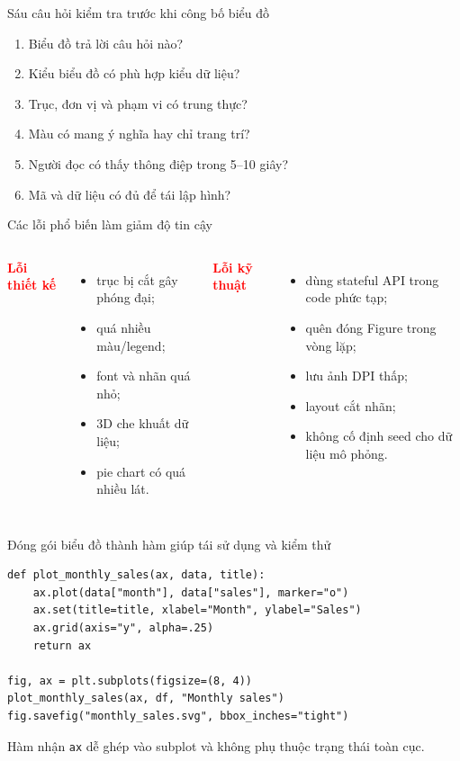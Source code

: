 \documentclass[aspectratio=169,12pt]{beamer}
\newcommand{\muted}[1]{\textcolor{Muted}{#1}}
\newcommand{\bad}[1]{\textcolor{Red}{\textbf{#1}}}
\begin{document}
\begin{frame}{Sáu câu hỏi kiểm tra trước khi công bố biểu đồ}
\begin{enumerate}\setlength\itemsep{6pt}
  \item Biểu đồ trả lời câu hỏi nào?
  \item Kiểu biểu đồ có phù hợp kiểu dữ liệu?
  \item Trục, đơn vị và phạm vi có trung thực?
  \item Màu có mang ý nghĩa hay chỉ trang trí?
  \item Người đọc có thấy thông điệp trong 5--10 giây?
  \item Mã và dữ liệu có đủ để tái lập hình?
\end{enumerate}
\end{frame}

\begin{frame}{Các lỗi phổ biến làm giảm độ tin cậy}
\begin{columns}[T,onlytextwidth]
\bad{Lỗi thiết kế}
\begin{itemize}
  \item trục bị cắt gây phóng đại;
  \item quá nhiều màu/legend;
  \item font và nhãn quá nhỏ;
  \item 3D che khuất dữ liệu;
  \item pie chart có quá nhiều lát.
\end{itemize}
\bad{Lỗi kỹ thuật}
\begin{itemize}
  \item dùng stateful API trong code phức tạp;
  \item quên đóng Figure trong vòng lặp;
  \item lưu ảnh DPI thấp;
  \item layout cắt nhãn;
  \item không cố định seed cho dữ liệu mô phỏng.
\end{itemize}
\end{columns}
\end{frame}

\begin{frame}[fragile]{Đóng gói biểu đồ thành hàm giúp tái sử dụng và kiểm thử}
\begin{lstlisting}[style=py]
def plot_monthly_sales(ax, data, title):
    ax.plot(data["month"], data["sales"], marker="o")
    ax.set(title=title, xlabel="Month", ylabel="Sales")
    ax.grid(axis="y", alpha=.25)
    return ax

fig, ax = plt.subplots(figsize=(8, 4))
plot_monthly_sales(ax, df, "Monthly sales")
fig.savefig("monthly_sales.svg", bbox_inches="tight")
\end{lstlisting}
\muted{Hàm nhận \texttt{ax} dễ ghép vào subplot và không phụ thuộc trạng thái toàn cục.}
\end{frame}
\end{document}
